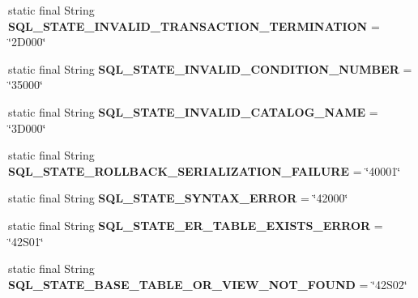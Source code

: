 \begin{DoxyCompactItemize}
static final String {\bfseries S\+Q\+L\+\_\+\+S\+T\+A\+T\+E\+\_\+\+I\+N\+V\+A\+L\+I\+D\+\_\+\+T\+R\+A\+N\+S\+A\+C\+T\+I\+O\+N\+\_\+\+T\+E\+R\+M\+I\+N\+A\+T\+I\+ON} = \char`\"{}2\+D000\char`\"{}
\item 
\mbox{\label{classcom_1_1mysql_1_1jdbc_1_1_s_q_l_error_a871f8ded41a8363c23a3f3cf8a4c2da2}} 
static final String {\bfseries S\+Q\+L\+\_\+\+S\+T\+A\+T\+E\+\_\+\+I\+N\+V\+A\+L\+I\+D\+\_\+\+C\+O\+N\+D\+I\+T\+I\+O\+N\+\_\+\+N\+U\+M\+B\+ER} = \char`\"{}35000\char`\"{}
\item 
\mbox{\label{classcom_1_1mysql_1_1jdbc_1_1_s_q_l_error_ad97c324d0a876690506bdaacbb7c088b}} 
static final String {\bfseries S\+Q\+L\+\_\+\+S\+T\+A\+T\+E\+\_\+\+I\+N\+V\+A\+L\+I\+D\+\_\+\+C\+A\+T\+A\+L\+O\+G\+\_\+\+N\+A\+ME} = \char`\"{}3\+D000\char`\"{}
\item 
\mbox{\label{classcom_1_1mysql_1_1jdbc_1_1_s_q_l_error_a1305bf24d15f45c812406398c16535c1}} 
static final String {\bfseries S\+Q\+L\+\_\+\+S\+T\+A\+T\+E\+\_\+\+R\+O\+L\+L\+B\+A\+C\+K\+\_\+\+S\+E\+R\+I\+A\+L\+I\+Z\+A\+T\+I\+O\+N\+\_\+\+F\+A\+I\+L\+U\+RE} = \char`\"{}40001\char`\"{}
\item 
\mbox{\label{classcom_1_1mysql_1_1jdbc_1_1_s_q_l_error_aa47c2f91bb7bfe6518e76f7bda911446}} 
static final String {\bfseries S\+Q\+L\+\_\+\+S\+T\+A\+T\+E\+\_\+\+S\+Y\+N\+T\+A\+X\+\_\+\+E\+R\+R\+OR} = \char`\"{}42000\char`\"{}
\item 
\mbox{\label{classcom_1_1mysql_1_1jdbc_1_1_s_q_l_error_ac6cefb60ede97d8919a054483a8c4bf8}} 
static final String {\bfseries S\+Q\+L\+\_\+\+S\+T\+A\+T\+E\+\_\+\+E\+R\+\_\+\+T\+A\+B\+L\+E\+\_\+\+E\+X\+I\+S\+T\+S\+\_\+\+E\+R\+R\+OR} = \char`\"{}42\+S01\char`\"{}
\item 
\mbox{\label{classcom_1_1mysql_1_1jdbc_1_1_s_q_l_error_a3b7748b0020d116669db318d6501c331}} 
static final String {\bfseries S\+Q\+L\+\_\+\+S\+T\+A\+T\+E\+\_\+\+B\+A\+S\+E\+\_\+\+T\+A\+B\+L\+E\+\_\+\+O\+R\+\_\+\+V\+I\+E\+W\+\_\+\+N\+O\+T\+\_\+\+F\+O\+U\+ND} = \char`\"{}42\+S02\char`\"{}
\item 

\end{DoxyCompactItemize}
